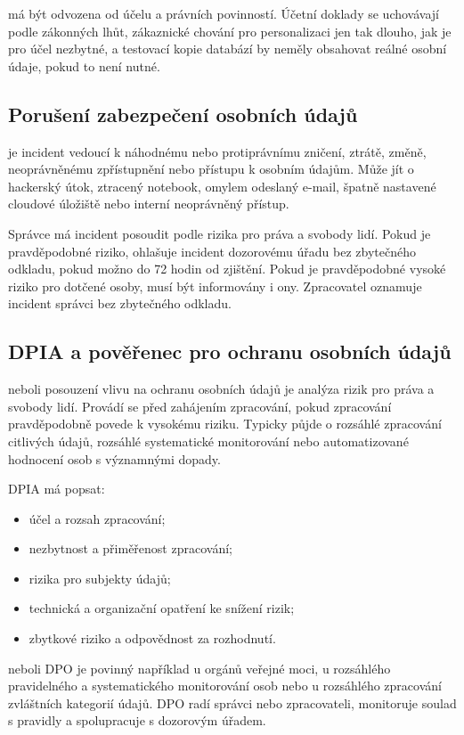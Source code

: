  má být odvozena od účelu a právních povinností. Účetní doklady se uchovávají
podle zákonných lhůt, zákaznické chování pro personalizaci jen tak dlouho, jak je pro účel nezbytné,
a testovací kopie databází by neměly obsahovat reálné osobní údaje, pokud to není nutné.

\subsection{Porušení zabezpečení osobních údajů}
 je incident vedoucí k náhodnému nebo protiprávnímu zničení,
ztrátě, změně, neoprávněnému zpřístupnění nebo přístupu k osobním údajům. Může jít o hackerský útok,
ztracený notebook, omylem odeslaný e-mail, špatně nastavené cloudové úložiště nebo interní neoprávněný
přístup.

Správce má incident posoudit podle rizika pro práva a svobody lidí. Pokud je pravděpodobné riziko,
ohlašuje incident dozorovému úřadu bez zbytečného odkladu, pokud možno do 72 hodin od zjištění.
Pokud je pravděpodobné vysoké riziko pro dotčené osoby, musí být informovány i ony. Zpracovatel
oznamuje incident správci bez zbytečného odkladu.

\subsection{DPIA a pověřenec pro ochranu osobních údajů}
 neboli posouzení vlivu na ochranu osobních údajů je
analýza rizik pro práva a svobody lidí. Provádí se před zahájením zpracování, pokud zpracování
pravděpodobně povede k vysokému riziku. Typicky půjde o rozsáhlé zpracování citlivých údajů, rozsáhlé
systematické monitorování nebo automatizované hodnocení osob s významnými dopady.

DPIA má popsat:
\begin{itemize}
  \item účel a rozsah zpracování;
  \item nezbytnost a přiměřenost zpracování;
  \item rizika pro subjekty údajů;
  \item technická a organizační opatření ke snížení rizik;
  \item zbytkové riziko a odpovědnost za rozhodnutí.
\end{itemize}

 neboli DPO je povinný například u orgánů veřejné moci,
u rozsáhlého pravidelného a systematického monitorování osob nebo u rozsáhlého zpracování zvláštních
kategorií údajů. DPO radí správci nebo zpracovateli, monitoruje soulad s pravidly a spolupracuje
s dozorovým úřadem.

